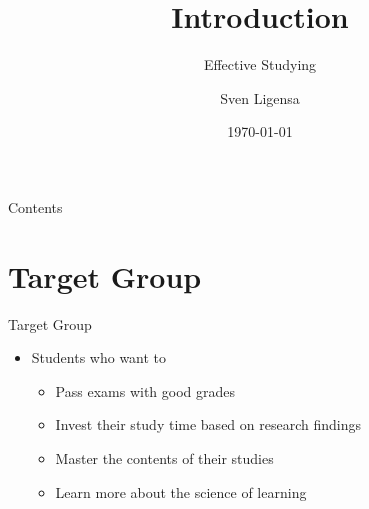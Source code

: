 \documentclass{ercisbeamer}
\title{Introduction}
\subtitle{Effective Studying}
\author{Sven Ligensa}
\institute{European Research Center for Information Systems (ERCIS)}
\date{\today}
\begin{document}
\begin{frame}
    \begin{tbox}
        \titlepage
    \end{tbox}
\end{frame}
\setbgimage{}

\begin{frame}{Contents}
    \tableofcontents
\end{frame}

\section{Target Group}
\begin{frame}{Target Group}
    \begin{itemize}
        \item Students  who want to
        \begin{itemize}
            \item Pass exams with good grades
            \item Invest their study time based on research findings
            \item Master the contents of their studies
            \item Learn more about the science of learning
        \end{itemize}
    \end{itemize}
\end{frame}
\end{document}
